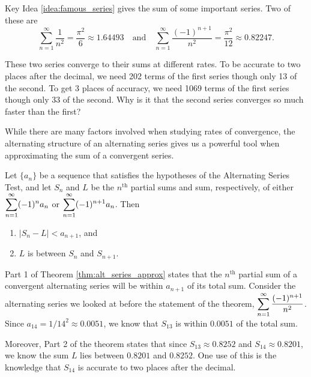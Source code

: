 Key Idea \ref{idea:famous_series} gives the sum of some important series. Two of these are
$$\sum_{n=1}^\infty \frac1{n^2} =\frac{\pi^2}6 \approx 1.64493 \quad \text{and} \quad \sum_{n=1}^\infty \frac{(-1)^{n+1}}{n^2} = \frac{\pi^2}{12}\approx 0.82247.$$

These two series converge to their sums at different rates. To be accurate to two places after the decimal, we need 202 terms of the first series though only 13 of the second. To get 3 places of accuracy, we need 1069 terms of the first series though only 33 of the second. Why is it that the second series converges so much faster than the first?

While there are many factors involved when studying rates of convergence, the alternating structure of an alternating series gives us a powerful tool when approximating the sum of a convergent series. 

{Let $\{a_n\}$ be a sequence that satisfies the hypotheses of the Alternating Series Test, and let $S_n$ and $L$ be the $n^\text{th}$ partial sums and sum, respectively, of either $\displaystyle \sum_{n=1}^\infty (-1)^{n}a_n$ or $\displaystyle \sum_{n=1}^\infty (-1)^{n+1}a_n$. Then
\begin{enumerate}
	\item $|S_n-L| < a_{n+1}$, and
	\item	$L$ is between $S_n$ and $S_{n+1}$.
\end{enumerate}
}

Part 1 of Theorem \ref{thm:alt_series_approx} states that the $n^\text{th}$ partial sum of a convergent alternating series will be within $a_{n+1}$ of its total sum. Consider the alternating series we looked at before the statement of the theorem, $\displaystyle \sum_{n=1}^\infty \frac{(-1)^{n+1}}{n^2}$. Since $a_{14} = 1/14^2 \approx 0.0051$, we know that $S_{13}$ is within $0.0051$ of the total sum. %

Moreover, Part 2 of the theorem states that since $S_{13} \approx 0.8252$ and $S_{14}\approx 0.8201$, we know the sum $L$ lies between $0.8201$ and $0.8252$. One use of this is the knowledge that $S_{14}$ is accurate to two places after the decimal.


